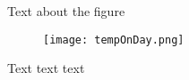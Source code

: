 
Text about the figure

\begin{figure}
\texttt{[image: tempOnDay.png]}
\caption{\label{fig:tempOnDay}}
\end{figure}

Text text text 

